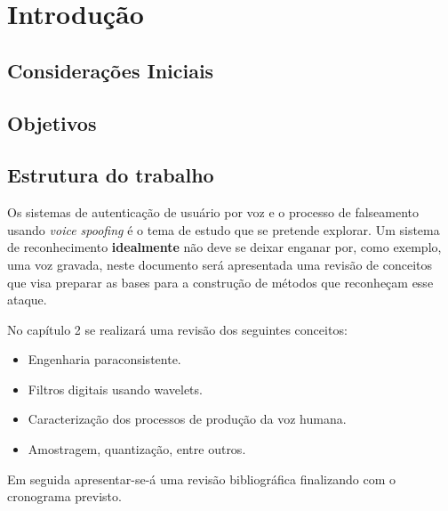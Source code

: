 \chapter{Introdução}
	\begin{myenv}{1.5}
		
		\section{Considerações Iniciais}
		\section{Objetivos}
		\section{Estrutura do trabalho}
		\par Os sistemas de autenticação de usuário por voz e o processo de falseamento usando \textit{voice spoofing} é o tema de estudo que se pretende explorar. Um sistema de reconhecimento \textbf{idealmente} não deve se deixar enganar por, como exemplo, uma voz gravada, neste documento será apresentada uma revisão de conceitos que visa preparar as bases para a construção de métodos que reconheçam esse ataque.
		
		\par No capítulo 2 se realizará uma revisão dos seguintes conceitos:
		\begin{itemize}
			\item Engenharia paraconsistente.
			\item Filtros digitais usando wavelets.
			\item Caracterização dos processos de produção da voz humana.
			\item Amostragem, quantização, entre outros.
		\end{itemize}
		\par Em seguida apresentar-se-á uma revisão bibliográfica finalizando com o cronograma previsto.
		
		
	\end{myenv}